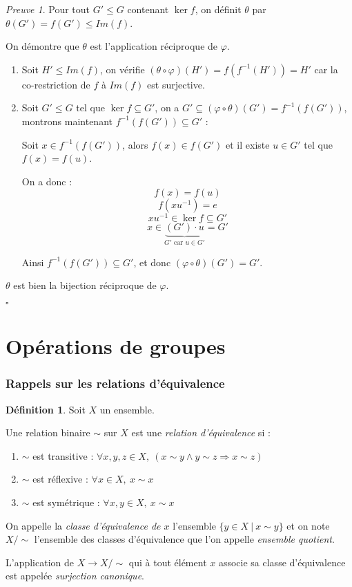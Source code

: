 \documentclass[]{article}
\theoremstyle{remark}
\newtheorem{myproof}{Preuve}
\theoremstyle{definition}
\newtheorem{mydef}{Définition}
\newcommand{\cqfd}{
	\hfill$\square$
}
\begin{document}
\begin{myproof}
	Pour tout $G' \leqslant G$ contenant $\ker f$, on définit $\theta$ par $\theta(G')=f(G') \leqslant Im(f)$.
	
	On démontre que $\theta$ est l'application réciproque de $\varphi$.
	
	\begin{enumerate}
		\item Soit $H' \leqslant Im(f)$, on vérifie $(\theta \circ \varphi)(H')=f(f^{-1}(H'))=H'$ car la co-restriction de $f$ à $Im(f)$ est surjective.
		
		\item Soit $G' \leqslant G$ tel que $\ker f \subseteq G'$, on a $G' \subseteq (\varphi \circ \theta)(G')=f^{-1}(f(G'))$, montrons maintenant $f^{-1}(f(G')) \subseteq G'$ :
		
		Soit $x \in f^{-1}(f(G'))$, alors $f(x) \in f(G')$ et il existe $u \in G'$ tel que $f(x)=f(u)$.
		
		On a donc : $$f(x)=f(u)$$
		$$f(xu^{-1})=e$$
		$$xu^{-1} \in \ker f \subseteq G'$$
		$$x \in \underbrace{\left(G'\right) \cdot u}_{G' \text{ car } u \in G'}=G'$$
		
		Ainsi $f^{-1}(f(G')) \subseteq G'$, et donc $(\varphi \circ \theta)(G')=G'$.
	\end{enumerate}
	
	$\theta$ est bien la bijection réciproque de $\varphi$.
	
	\cqfd
\end{myproof}

\part{Opérations de groupes}

\section{Rappels sur les relations d'équivalence}

\begin{mydef}Soit $X$ un ensemble.

	Une relation binaire $\sim$ sur $X$ est une \textit{relation d'équivalence} si :
	\begin{enumerate}
		\item $\sim$ est transitive : $\forall x, y, z \in X, ~ (x \sim y \land y \sim z \Longrightarrow x \sim z)$
		\item $\sim$ est réflexive : $\forall x \in X, ~ x \sim x$
		\item $\sim$ est symétrique : $\forall x, y \in X, ~ x \sim x$
	\end{enumerate}
	
	On appelle la \textit{classe d'équivalence de $x$} l'ensemble $\{y \in X ~ | ~ x \sim y\}$ et on note $X/\sim$ l'ensemble des classes d'équivalence que l'on appelle \textit{ensemble quotient}.
	
	L'application de $X \longrightarrow X/\sim$ qui à tout élément $x$ associe sa classe d'équivalence est appelée \textit{surjection canonique}.
\end{mydef}
\end{document}
